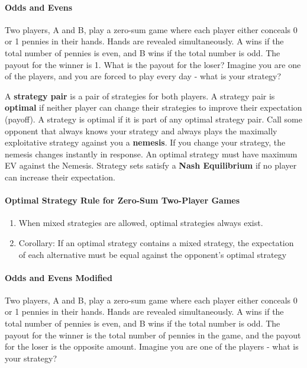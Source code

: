 \documentclass{article}
\begin{document}
\paragraph{Odds and Evens}
Two players, A and B, play a zero-sum game where each player either conceals 0 or 1 pennies in their hands. Hands are revealed simultaneously. A wins if the total number of pennies is even, and B wins if the total number is odd. The payout for the winner is 1. What is the payout for the loser? Imagine you are one of the players, and you are forced to play every day - what is your strategy?
\newline
\newline



A \textbf{strategy pair} is a pair of strategies for both players. A strategy pair is \textbf{optimal} if neither player can change their strategies to improve their expectation (payoff). A strategy is optimal if it is part of any optimal strategy pair. 
\newline
\newline
Call some opponent that always knows your strategy and always plays the maximally exploitative strategy against you a \textbf{nemesis}. If you change your strategy, the nemesis changes instantly in response. An optimal strategy must have maximum EV against the Nemesis. Strategy sets satisfy a \textbf{Nash Equilibrium} if no player can increase their expectation. 

\paragraph{Optimal Strategy Rule for Zero-Sum Two-Player Games}
\begin{enumerate}
    \item When mixed strategies are allowed, optimal strategies always exist.
    \item Corollary: If an optimal strategy contains a mixed strategy, the expectation of each alternative must be equal against the opponent's optimal strategy
\end{enumerate}

\paragraph{Odds and Evens Modified}
Two players, A and B, play a zero-sum game where each player either conceals 0 or 1 pennies in their hands. Hands are revealed simultaneously. A wins if the total number of pennies is even, and B wins if the total number is odd. The payout for the winner is the total number of pennies in the game, and the payout for the loser is the opposite amount. Imagine you are one of the players - what is your strategy?
\newline
\newline
\end{document}
